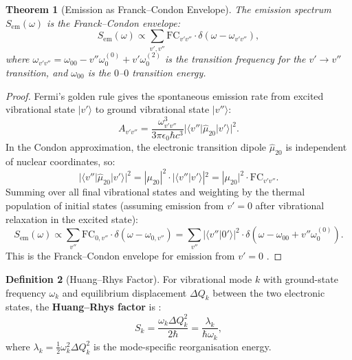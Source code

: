 \documentclass[11pt,twocolumn,a4paper]{article}
\newtheorem{theorem}{Theorem}[section]
\theoremstyle{definition}
\newtheorem{definition}[theorem]{Definition}
\theoremstyle{remark}
\begin{document}
\begin{theorem}[Emission as Franck--Condon Envelope]
\label{thm:fc_envelope}
The emission spectrum $S_{\mathrm{em}}(\omega)$ is the Franck--Condon envelope:
\begin{equation}
\label{eq:fc_envelope}
S_{\mathrm{em}}(\omega) \propto \sum_{v', v''} \mathrm{FC}_{v'v''} \cdot \delta(\omega - \omega_{v'v''}),
\end{equation}
where $\omega_{v'v''} = \omega_{00} - v'' \omega_0^{(0)} + v' \omega_0^{(2)}$ is the transition frequency for the $v' \to v''$ transition, and $\omega_{00}$ is the $0$--$0$ transition energy.
\end{theorem}

\begin{proof}
Fermi's golden rule gives the spontaneous emission rate from excited vibrational state $|v'\rangle$ to ground vibrational state $|v''\rangle$:
\begin{equation}
A_{v'v''} = \frac{\omega_{v'v''}^3}{3\pi\epsilon_0\hbar c^3} |\langle v'' | \hat{\mu}_{20} | v' \rangle|^2.
\end{equation}
In the Condon approximation, the electronic transition dipole $\hat{\mu}_{20}$ is independent of nuclear coordinates, so:
\begin{equation}
|\langle v'' | \hat{\mu}_{20} | v' \rangle|^2 = |\mu_{20}|^2 \cdot |\langle v'' | v' \rangle|^2 = |\mu_{20}|^2 \cdot \mathrm{FC}_{v'v''}.
\end{equation}
Summing over all final vibrational states and weighting by the thermal population of initial states (assuming emission from $v' = 0$ after vibrational relaxation in the excited state):
\begin{equation}
S_{\mathrm{em}}(\omega) \propto \sum_{v''} \mathrm{FC}_{0,v''} \cdot \delta(\omega - \omega_{0,v''}) = \sum_{v''} |\langle v'' | 0' \rangle|^2 \cdot \delta(\omega - \omega_{00} + v'' \omega_0^{(0)}).
\end{equation}
This is the Franck--Condon envelope for emission from $v' = 0$ \citep{condon1928}.
\end{proof}

\begin{definition}[Huang--Rhys Factor]
\label{def:hr}
For vibrational mode $k$ with ground-state frequency $\omega_k$ and equilibrium displacement $\Delta Q_k$ between the two electronic states, the \textbf{Huang--Rhys factor} is \citep{huangrhys1950}:
\begin{equation}
S_k = \frac{\omega_k \Delta Q_k^2}{2\hbar} = \frac{\lambda_k}{\hbar\omega_k},
\end{equation}
where $\lambda_k = \frac{1}{2}\omega_k^2 \Delta Q_k^2$ is the mode-specific reorganisation energy.
\end{definition}
\end{document}
